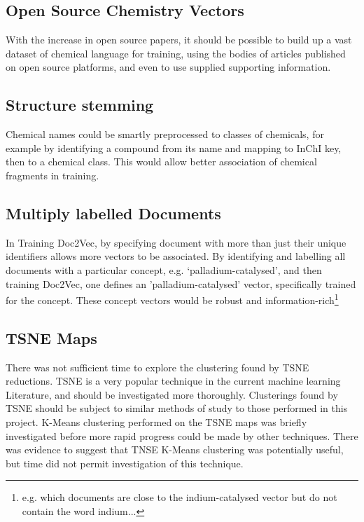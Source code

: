 \subsection{Open Source Chemistry Vectors}
With the increase in open source papers, it should be possible to build up a vast dataset of chemical language for training, using the bodies of articles published on open source platforms, and even to use supplied supporting information. 
\subsection{Structure stemming}
Chemical names could be smartly preprocessed to classes of chemicals, for example by identifying a compound from its name and mapping to InChI key, then to a chemical class. This would allow better association of chemical fragments in training.
\subsection{Multiply labelled Documents}
In Training Doc2Vec, by specifying document with more than just their unique identifiers allows more vectors to be associated. By identifying and labelling all documents with a particular concept, e.g. `palladium-catalysed', and then training Doc2Vec, one defines an 'palladium-catalysed' vector, specifically trained for the concept. These concept vectors would be robust and information-rich\footnote{e.g. which documents are close to the indium-catalysed vector but do not contain the word indium...}
\subsection{TSNE Maps}
There was not sufficient time to explore the clustering found by TSNE reductions. TSNE is a very popular technique in the current machine learning Literature, and should be investigated more thoroughly. Clusterings found by TSNE should be subject to similar methods of study to those performed in this project. K-Means clustering performed on the TSNE maps was briefly investigated before more rapid progress could be made by other techniques. There was evidence to suggest that TNSE K-Means clustering was potentially useful, but time did not permit investigation of this technique.